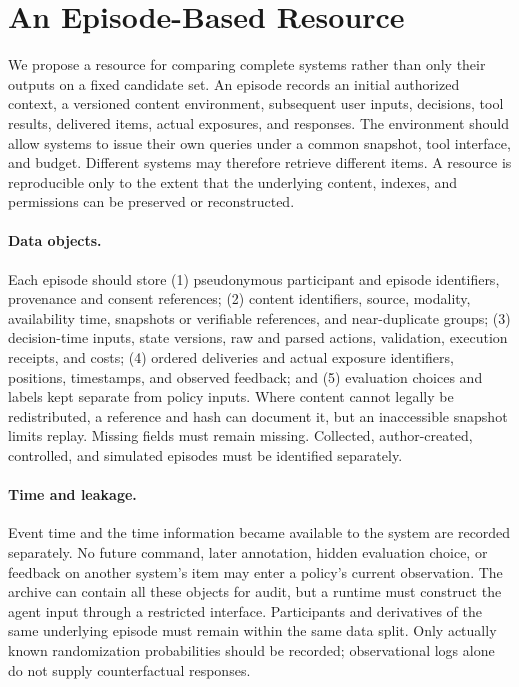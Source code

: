 \documentclass[11pt]{article}
\begin{document}
\section{An Episode-Based Resource}
\label{sec:resource}
We propose a resource for comparing complete systems rather than only their outputs on a fixed candidate set. An episode records an initial authorized context, a versioned content environment, subsequent user inputs, decisions, tool results, delivered items, actual exposures, and responses. The environment should allow systems to issue their own queries under a common snapshot, tool interface, and budget. Different systems may therefore retrieve different items. A resource is reproducible only to the extent that the underlying content, indexes, and permissions can be preserved or reconstructed.

\paragraph{Data objects.} Each episode should store (1) pseudonymous participant and episode identifiers, provenance and consent references; (2) content identifiers, source, modality, availability time, snapshots or verifiable references, and near-duplicate groups; (3) decision-time inputs, state versions, raw and parsed actions, validation, execution receipts, and costs; (4) ordered deliveries and actual exposure identifiers, positions, timestamps, and observed feedback; and (5) evaluation choices and labels kept separate from policy inputs. Where content cannot legally be redistributed, a reference and hash can document it, but an inaccessible snapshot limits replay. Missing fields must remain missing. Collected, author-created, controlled, and simulated episodes must be identified separately.

\paragraph{Time and leakage.} Event time and the time information became available to the system are recorded separately. No future command, later annotation, hidden evaluation choice, or feedback on another system's item may enter a policy's current observation. The archive can contain all these objects for audit, but a runtime must construct the agent input through a restricted interface. Participants and derivatives of the same underlying episode must remain within the same data split. Only actually known randomization probabilities should be recorded; observational logs alone do not supply counterfactual responses.
\end{document}
